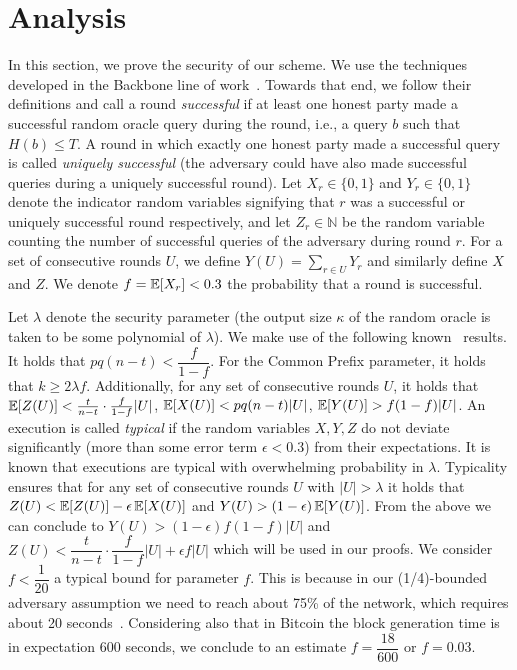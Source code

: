 \section{Analysis}\label{sec:analysis}
In this section, we prove the security of our scheme. We use the techniques
developed in the Backbone line of work~\cite{backbone}. Towards that end, we
follow their definitions and call a round \emph{successful} if at least one
honest party made a successful random oracle query during the round, i.e., a
query $b$ such that $H(b) \leq T$. A round in which exactly one honest party
made a successful query is called \emph{uniquely successful} (the adversary
could have also made successful queries during a uniquely successful round). Let
$X_r \in \{0, 1\}$ and $Y_r \in \{0, 1\}$ denote the indicator random variables
signifying that $r$ was a successful or uniquely successful round respectively,
and let $Z_r \in \mathbb{N}$ be the random variable counting the number of
successful queries of the adversary during round $r$. For a set of consecutive
rounds $U$, we define $Y(U) = \sum_{r \in U} Y_r$ and similarly define $X$ and
$Z$. We denote $f = \operatorname{\mathbb{E}}[X_r] < 0.3$ the probability that a round is successful.

Let $\lambda$ denote the security parameter (the output size $\kappa$ of the
random oracle is taken to be some polynomial of $\lambda$).
We make use of the following known~\cite{backbone} results.
It holds that $pq(n-t) < \dfrac{f}{1-f}$. For the Common Prefix
parameter, it holds that $k \geq 2\lambda f$.
Additionally, for any set of
consecutive rounds $U$, it holds that
$\operatorname{\mathbb{E}}[Z(U)] < \frac{t}{n-t} \cdot \frac{f}{1 - f}|U|$,
$\operatorname{\mathbb{E}}[X(U)] < pq(n - t)|U|$,
$\operatorname{\mathbb{E}}[Y(U)] > f(1 - f)|U|$.
An execution is called \emph{typical}
if the random variables $X, Y, Z$ do not deviate significantly (more than some
error term $\epsilon < 0.3$) from their expectations. It is known that
executions are typical with overwhelming probability in
$\lambda$. Typicality ensures that for any set of consecutive
rounds $U$ with $|U| > \lambda$ it holds that
$Z(U) < \operatorname{\mathbb{E}}[Z(U)] - \epsilon\operatorname{\mathbb{E}}[X(U)]$ and
$Y(U) > (1 - \epsilon)\operatorname{\mathbb{E}}[Y(U)]$.
From the above we can conclude to
$Y(U) > (1 - \epsilon)f(1-f) \lvert U \rvert$ and
$Z(U) < \dfrac{t}{n-t} \cdot \dfrac{f}{1-f} \lvert U \rvert + \epsilon f \lvert U \rvert $ which will be used in our proofs.
We consider $f < \dfrac{1}{20}$ a typical bound for parameter $f$. This is because in our (1/4)-bounded adversary assumption we need to reach about 75\% of the network, which requires about 20 seconds~\cite{Wattenhofer}. Considering also that in Bitcoin the block generation time is in expectation 600 seconds, we conclude to an estimate $f = \dfrac{18}{600}$ or $f = 0.03$.

